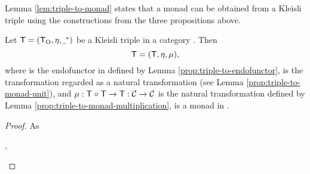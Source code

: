 Lemma \ref{lem:triple-to-monad} states that a monad can be obtained
from a Kleisli triple using the constructions from the three propositions
above.

\begin{lemma}
  \label{lem:triple-to-monad}
  Let $\mathsf{T} = (\mathsf{T}_{\operatorname{O}}, \eta, \underline{~}^*)$ be a Kleisli triple in
  a category . Then
  \begin{equation*}
    \mathsf{T} = (\mathsf{T}, \eta, \mu)
    \text{,}
  \end{equation*}
  where  is the endofunctor in  defined by Lemma
  \ref{prop:triple-to-endofunctor}, \nat{\eta} is the transformation
  \nat{\eta} regarded as a natural transformation (see Lemma
  \ref{prop:triple-to-monad-unit}), and $\mu: \mathsf{T} \mathrel{\circ}
  \mathsf{T} \to \mathsf{T}: \mathcal{C} \to \mathcal{C}$ is the natural
  transformation defined by Lemma
  \ref{prop:triple-to-monad-multiplication}, is a monad in .
  \begin{proof}
    As
    \begin{steps}
      ,

\end{steps}
\end{proof}
\end{lemma}
